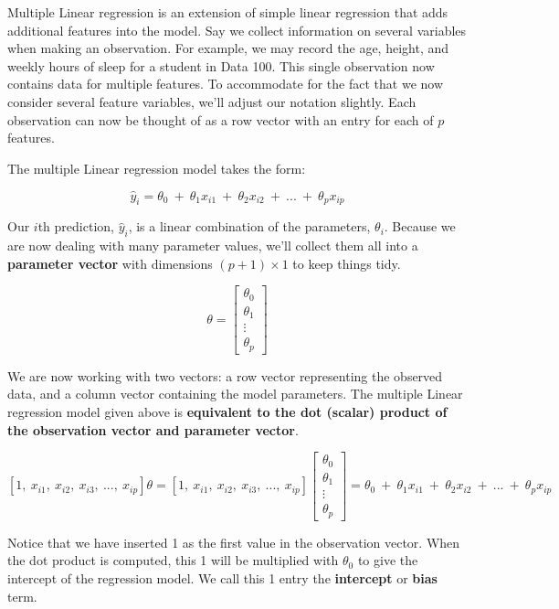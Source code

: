\documentclass[
  letterpaper,
  DIV=11,
  numbers=noendperiod]{scrreprt}
\begin{document}
Multiple Linear regression is an extension of simple linear regression
that adds additional features into the model. Say we collect information
on several variables when making an observation. For example, we may
record the age, height, and weekly hours of sleep for a student in Data
100. This single observation now contains data for multiple features. To
accommodate for the fact that we now consider several feature variables,
we'll adjust our notation slightly. Each observation can now be thought
of as a row vector with an entry for each of \(p\) features.

The multiple Linear regression model takes the form:

\[\hat{y}_i = \theta_0\:+\:\theta_1x_{i1}\:+\:\theta_2 x_{i2}\:+\:...\:+\:\theta_p x_{ip}\]

Our \(i\)th prediction, \(\hat{y}_i\), is a linear combination of the
parameters, \(\theta_i\). Because we are now dealing with many parameter
values, we'll collect them all into a \textbf{parameter vector} with
dimensions \((p+1) \times 1\) to keep things tidy.

\[\theta = \begin{bmatrix}
           \theta_{0} \\
           \theta_{1} \\
           \vdots \\
           \theta_{p}
         \end{bmatrix}\]

We are now working with two vectors: a row vector representing the
observed data, and a column vector containing the model parameters. The
multiple Linear regression model given above is \textbf{equivalent to
the dot (scalar) product of the observation vector and parameter
vector}.

\[[1,\:x_{i1},\:x_{i2},\:x_{i3},\:...,\:x_{ip}] \theta = [1,\:x_{i1},\:x_{i2},\:x_{i3},\:...,\:x_{ip}] \begin{bmatrix}
           \theta_{0} \\
           \theta_{1} \\
           \vdots \\
           \theta_{p}
         \end{bmatrix} = \theta_0\:+\:\theta_1x_{i1}\:+\:\theta_2 x_{i2}\:+\:...\:+\:\theta_p x_{ip}\]

Notice that we have inserted 1 as the first value in the observation
vector. When the dot product is computed, this 1 will be multiplied with
\(\theta_0\) to give the intercept of the regression model. We call this
1 entry the \textbf{intercept} or \textbf{bias} term.
\end{document}
